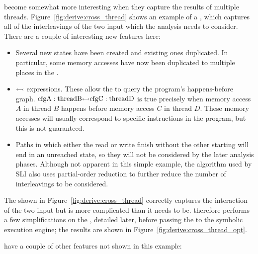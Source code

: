 \STateMachines become somewhat more interesting when they capture the
results of multiple threads.  Figure~\ref{fig:derive:cross_thread}
shows an example of a ,
which captures all of the interleavings of the two input
{\StateMachines} which the analysis needs to consider.  There are a
couple of interesting new features here:

\begin{itemize}
\item Several new states have been created and existing ones
  duplicated.  In particular, some memory accesses have now been
  duplicated to multiple places in the \StateMachine.
\item
  $\leftarrowtail$ expressions.  These allow the {\StateMachine}
  to query the program's happens-before graph.
  $\mathrm{cfgA}:\mathrm{threadB} {\leftarrowtail} \mathrm{cfgC}:\mathrm{threadD}$ is true
  precisely when memory access $A$ in thread $B$ happens before memory
  access $C$ in thread $D$.  These memory accesses will usually
  correspond to specific instructions in the program, but this is not
  guaranteed.

\item
  Paths in which either the read or write  finish
  without the other starting will end in an unreached state, so they
  will not be considered by the later analysis phases.  Although not
  apparent in this simple example, the algorithm used by SLI also uses
  partial-order reduction\needCite{} to further reduce the number of
  interleavings to be considered.
\end{itemize}

The {\StateMachine} shown in Figure~\ref{fig:derive:cross_thread}
correctly captures the interaction of the two input {\StateMachines}
but is more complicated than it needs to be.  {\Technique} therefore
performs a few simplifications on the \StateMachine, detailed later,
before passing the {\StateMachine} to the symbolic execution engine;
the results are shown in Figure~\ref{fig:derive:cross_thread_opt}.

\STateMachines have a couple of other features not shown in this
example:

